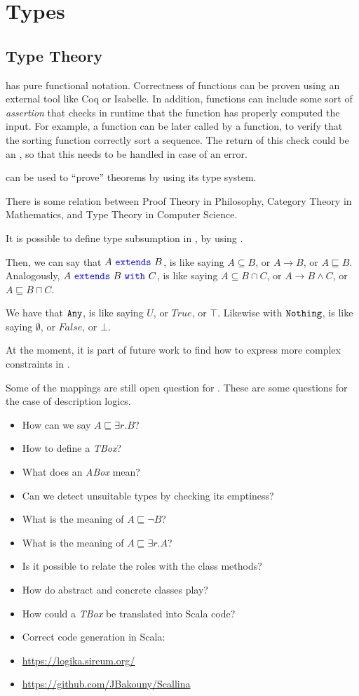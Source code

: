 \chapter{Types}


\section{Type Theory}

\Soda has pure functional notation.
Correctness of functions can be proven using an external tool like Coq or Isabelle.
In addition, functions can include some sort of \textit{assertion} that checks in runtime that the function has properly computed the input.
For example, a  function can be later called by a  function, to verify that the sorting function correctly sort a sequence.
The return of this check could be an , so that this needs to be handled in case of an error.

\Soda can be used to ``prove'' theorems by using its type system.

There is some relation between Proof Theory in Philosophy, Category Theory in Mathematics, and Type Theory in Computer Science.

It is possible to define type subsumption in \Soda, by using \sextends.

Then, we can say that $A \ \sextends\ B$, is like saying $A \subseteq B$, or $A \to B$, or $A \sqsubseteq B$.
Analogously, $A \ \sextends\ B \ \swith\ C$, is like saying $A \subseteq B \cap C $, or $A \to B \land C$, or $A \sqsubseteq B \sqcap C$.

We have that $\texttt{{Any}}$, is like saying $U$, or $True$, or $\top$.
Likewise with $\texttt{{Nothing}}$, is like saying $\emptyset$, or $False$, or $\bot$.

At the moment, it is part of future work to find how to express more complex constraints in \Soda.

Some of the mappings are still open question for \Soda.
These are some questions for the case of description logics.

\begin{itemize}
    \item How can we say $A \sqsubseteq \exists r. B $?
    \item How to define a \textit{TBox}?
    \item What does an \textit{ABox} mean?
    \item Can we detect unsuitable types by checking its emptiness?
    \item What is the meaning of $A \sqsubseteq \lnot B$?
    \item What is the meaning of $A \sqsubseteq \exists r. A$?
    \item Is it possible to relate the roles with the class methods?
    \item How do abstract and concrete classes play?
    \item How could a \textit{TBox} be translated into Scala code?
\end{itemize}

\begin{itemize}
    \item Correct code generation in Scala:
    \item \url{https://logika.sireum.org/}
    \item \url{https://github.com/JBakouny/Scallina}
\end{itemize}

